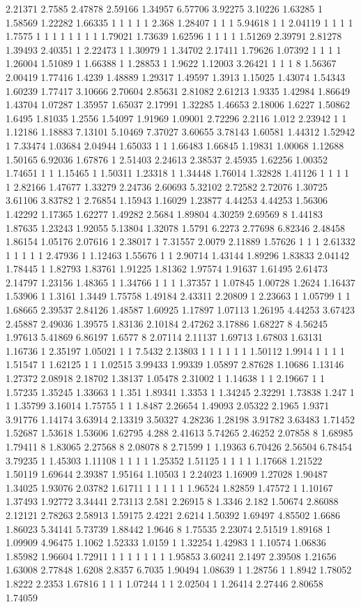 2.21371 2.7585 2.47878 2.59166 1.34957 6.57706 3.92275 3.10226 1.63285 1 1.58569 1.22282 1.66335 1 1 1 1 1 2.368 1.28407 1 1 1 5.94618 1 1 2.04119 1 1 1 1 1.7575 1 1 1 1 1 1 1 1 1.79021 1.73639 1.62596 1 1 1 1 1.51269 2.39791 2.81278 1.39493 2.40351 1 2.22473 1 1.30979 1 1.34702 2.17411 1.79626 1.07392 1 1 1 1 1.26004 1.51089 1 1.66388 1 1.28853 1 1.9622 1.12003 3.26421 1 1 1 8 1.56367 2.00419 1.77416 1.4239 1.48889 1.29317 1.49597 1.3913 1.15025 1.43074 1.54343 1.60239 1.77417 3.10666 2.70604 2.85631 2.81082 2.61213 1.9335 1.42984 1.86649 1.43704 1.07287 1.35957 1.65037 2.17991 1.32285 1.46653 2.18006 1.6227 1.50862 1.6495 1.81035 1.2556 1.54097 1.91969 1.09001 2.72296 2.2116 1.012 2.23942 1 1 1.12186 1.18883 7.13101 5.10469 7.37027 3.60655 3.78143 1.60581 1.44312 1.52942 1 7.33474 1.03684 2.04944 1.65033 1 1 1.66483 1.66845 1.19831 1.00068 1.12688 1.50165 6.92036 1.67876 1 2.51403 2.24613 2.38537 2.45935 1.62256 1.00352 1.74651 1 1 1.15465 1 1.50311 1.23318 1 1.34448 1.76014 1.32828 1.41126 1 1 1 1 1 2.82166 1.47677 1.33279 2.24736 2.60693 5.32102 2.72582 2.72076 1.30725 3.61106 3.83782 1 2.76854 1.15943 1.16029 1.23877 4.44253 4.44253 1.56306 1.42292 1.17365 1.62277 1.49282 2.5684 1.89804 4.30259 2.69569 8 1.44183 1.87635 1.23243 1.92055 5.13804 1.32078 1.5791 6.2273 2.77698 6.82346 2.48458 1.86154 1.05176 2.07616 1 2.38017 1 7.31557 2.0079 2.11889 1.57626 1 1 1 2.61332 1 1 1 1 1 2.47936 1 1.12463 1.55676 1 1 2.90714 1.43144 1.89296 1.83833 2.04142 1.78445 1 1.82793 1.83761 1.91225 1.81362 1.97574 1.91637 1.61495 2.61473 2.14797 1.23156 1.48365 1 1.34766 1 1 1 1.37357 1 1.07845 1.00728 1.2624 1.16437 1.53906 1 1.3161 1.3449 1.75758 1.49184 2.43311 2.20809 1 2.23663 1 1.05799 1 1 1.68665 2.39537 2.84126 1.48587 1.60925 1.17897 1.07113 1.26195 4.44253 3.67423 2.45887 2.49036 1.39575 1.83136 2.10184 2.47262 3.17886 1.68227 8 4.56245 1.97613 5.41869 6.86197 1.6577 8 2.07114 2.11137 1.69713 1.67803 1.63131 1.16736 1 2.35197 1.05021 1 1 7.5432 2.13803 1 1 1 1 1 1 1.50112 1.9914 1 1 1 1 1.51547 1 1.62125 1 1 1.02515 3.99433 1.99339 1.05897 2.87628 1.10686 1.13146 1.27372 2.08918 2.18702 1.38137 1.05478 2.31002 1 1.14638 1 1 2.19667 1 1 1.57235 1.35245 1.33663 1 1.351 1.89341 1.3353 1 1.34245 2.32291 1.73838 1.247 1 1 1.35799 3.16014 1.75755 1 1 1.8487 2.26654 1.49093 2.05322 2.1965 1.9371 3.91776 1.14174 3.63914 2.13319 3.50327 4.28236 1.28198 3.91782 3.63483 1.71452 1.52687 1.53618 1.53606 1.62795 4.288 2.41613 5.74265 2.46252 2.07858 8 1.68985 1.79411 8 1.83065 2.27568 8 2.08078 8 2.71599 1 1.19363 6.70426 2.56504 6.78454 3.79235 1 1.45303 1.11108 1 1 1 1 1.25352 1.51125 1 1 1 1 1.17668 1.21522 1.50119 1.69644 2.39387 1.95164 1.10503 1 2.24023 1.16909 1.27028 1.90487 1.34025 1.93076 2.03782 1.61711 1 1 1 1 1 1.96524 1.82859 1.47572 1 1.10167 1.37493 1.92772 3.34441 2.73113 2.581 2.26915 8 1.3346 2.182 1.50674 2.86088 2.12121 2.78263 2.58913 1.59175 2.4221 2.6214 1.50392 1.69497 4.85502 1.6686 1.86023 5.34141 5.73739 1.88442 1.9646 8 1.75535 2.23074 2.51519 1.89168 1 1.09909 4.96475 1.1062 1.52333 1.0159 1 1.32254 1.42983 1 1.10574 1.06836 1.85982 1.96604 1.72911 1 1 1 1 1 1 1 1.95853 3.60241 2.1497 2.39508 1.21656 1.63008 2.77848 1.6208 2.8357 6.7035 1.90494 1.08639 1 1.28756 1 1.8942 1.78052 1.8222 2.2353 1.67816 1 1 1 1.07244 1 1 2.02504 1 1.26414 2.27446 2.80658 1.74059 